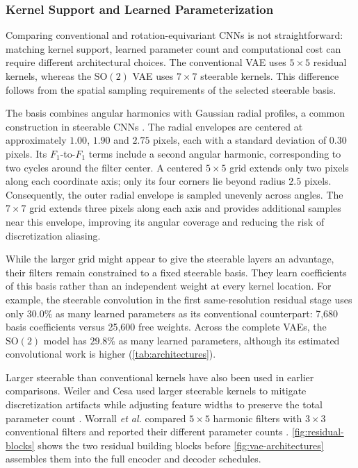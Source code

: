 \documentclass[conference,a4paper]{IEEEtran}
\newcommand{\SOtwo}{\mathrm{SO}(2)}
\begin{document}
\subsubsection{Kernel Support and Learned Parameterization}
\label{sec:kernel-support}
Comparing conventional and rotation-equivariant CNNs is not straightforward:
matching kernel support, learned parameter count and computational cost can
require different architectural choices. The conventional VAE uses
$5\times5$ residual kernels, whereas the $\SOtwo$ VAE uses $7\times7$
steerable kernels. This difference follows from the spatial sampling
requirements of the selected steerable basis.

The basis combines angular harmonics with Gaussian radial profiles, a common
construction in steerable CNNs \cite{weiler_general_2019}. The radial
envelopes are centered at approximately $1.00$, $1.90$ and $2.75$ pixels, each with
a standard deviation of $0.30$ pixels. Its $F_1$-to-$F_1$ terms include a second
angular harmonic, corresponding to two cycles around the filter center.
A centered $5\times5$ grid extends only two pixels along each coordinate axis;
only its four corners lie beyond radius $2.5$ pixels. Consequently, the outer
radial envelope is sampled unevenly across angles. The $7\times7$ grid
extends three pixels along each axis and provides additional samples near
this envelope, improving its angular coverage and reducing the risk of
discretization aliasing.

While the larger grid might appear to give the steerable layers an advantage,
their filters remain constrained to a fixed steerable basis. They learn
coefficients of this basis rather than an independent weight at every kernel
location. For example, the steerable convolution in the first same-resolution
residual stage uses only $30.0\%$ as many learned parameters as its conventional
counterpart: 7,680 basis coefficients versus 25,600 free weights. Across the
complete VAEs, the $\SOtwo$ model has $29.8\%$ as many learned parameters,
although its estimated convolutional work is higher
(\autoref{tab:architectures}).

Larger steerable than conventional kernels have also been used in earlier
comparisons. Weiler and Cesa used larger steerable kernels to mitigate
discretization artifacts while adjusting feature widths to preserve the total
parameter count \cite{weiler_general_2019}. Worrall \emph{et al.} compared
$5\times5$ harmonic filters with $3\times3$ conventional filters and
reported their different parameter counts \cite{worrall_harmonic_2017}.
\autoref{fig:residual-blocks} shows the two residual building blocks before
\autoref{fig:vae-architectures} assembles them into the full encoder and
decoder schedules.
\end{document}
